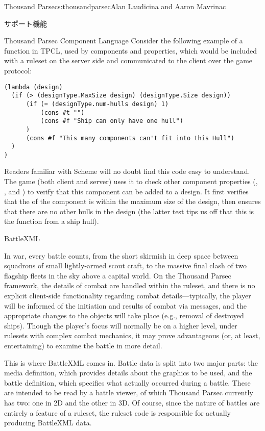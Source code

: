 \begin{aosachapter}{Thousand Parsec}{s:thousandparsec}{Alan Laudicina and Aaron Mavrinac}
\begin{aosasect1}{サポート機能}
\begin{aosasect2}{Thousand Parsec Component Language}
Consider the following example of a  function in
TPCL, used by components and properties, which would be included with
a ruleset on the server side and communicated to the client over the
game protocol:

\begin{verbatim}
(lambda (design)
  (if (> (designType.MaxSize design) (designType.Size design))
      (if (= (designType.num-hulls design) 1)
          (cons #t "")
          (cons #f "Ship can only have one hull")
      )
      (cons #f "This many components can't fit into this Hull")
  )
)
\end{verbatim}

Readers familiar with Scheme will no doubt find this code easy to
understand. The game (both client and server) uses it to check other
component properties (, , and
) to verify that this component can be added to a
design. It first verifies that the  of the component is
within the maximum size of the design, then ensures that there are no
other hulls in the design (the latter test tips us off that this is
the  function from a ship hull).

\end{aosasect2}

\begin{aosasect2}{BattleXML}

In war, every battle counts, from the short skirmish in deep space
between squadrons of small lightly-armed scout craft, to the massive
final clash of two flagship fleets in the sky above a capital
world. On the Thousand Parsec framework, the details of combat are
handled within the ruleset, and there is no explicit client-side
functionality regarding combat details---typically, the player will be
informed of the initiation and results of combat via messages, and the
appropriate changes to the objects will take place (e.g., removal of
destroyed ships). Though the player's focus will normally be on a
higher level, under rulesets with complex combat mechanics, it may
prove advantageous (or, at least, entertaining) to examine the battle
in more detail.

This is where BattleXML comes in. Battle data is split into two major
parts: the media definition, which provides details about the graphics
to be used, and the battle definition, which specifies what actually
occurred during a battle. These are intended to be read by a battle
viewer, of which Thousand Parsec currently has two: one in 2D and the
other in 3D\@. Of course, since the nature of battles are entirely a
feature of a ruleset, the ruleset code is responsible for actually
producing BattleXML data.


\end{aosasect2}
\end{aosasect1}
\end{aosachapter}
